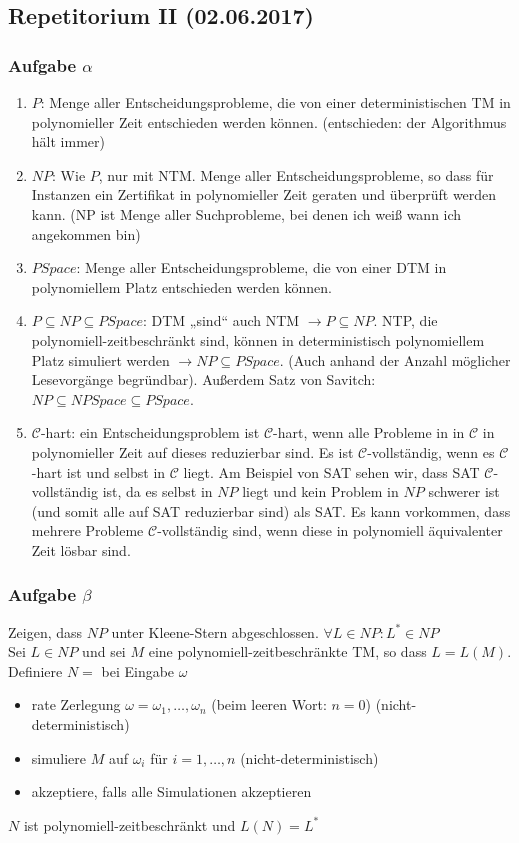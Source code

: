 \subsection{Repetitorium II (02.06.2017)}
\subsubsection*{Aufgabe $\alpha$}
    \begin{enumerate}
        \item $P$: Menge aller Entscheidungsprobleme, die von einer deterministischen TM in polynomieller Zeit entschieden werden können. (entschieden: der Algorithmus hält immer)
        \item $NP$: Wie $P$, nur mit NTM. Menge aller Entscheidungsprobleme, so dass für Instanzen ein Zertifikat in polynomieller Zeit geraten und überprüft werden kann. (NP ist Menge aller Suchprobleme, bei denen ich weiß wann ich angekommen bin)
        \item $PSpace$: Menge aller Entscheidungsprobleme, die von einer DTM in polynomiellem Platz entschieden werden können.
        \item $P \subseteq NP \subseteq PSpace$: DTM „sind“ auch NTM $\to P \subseteq NP$. NTP, die polynomiell-zeitbeschränkt sind, können in deterministisch polynomiellem Platz simuliert werden $\to NP \subseteq PSpace$. (Auch anhand der Anzahl möglicher Lesevorgänge begründbar). Außerdem Satz von Savitch: $NP \subseteq NPSpace \subseteq PSpace$.
        \item $\mathcal{C}$-hart: ein Entscheidungsproblem ist $\mathcal{C}$-hart, wenn alle Probleme in in $\mathcal{C}$ in polynomieller Zeit auf dieses reduzierbar sind. Es ist $\mathcal{C}$-vollständig, wenn es $\mathcal{C}$-hart ist und selbst in $\mathcal{C}$ liegt. Am Beispiel von SAT sehen wir, dass SAT $\mathcal{C}$-vollständig ist, da es selbst in $NP$ liegt und kein Problem in $NP$ schwerer ist (und somit alle auf SAT reduzierbar sind) als SAT. Es kann vorkommen, dass mehrere Probleme $\mathcal{C}$-vollständig sind, wenn diese in polynomiell äquivalenter Zeit lösbar sind.
    \end{enumerate}

\subsubsection*{Aufgabe $\beta$}
    Zeigen, dass $NP$ unter Kleene-Stern abgeschlossen. $\forall L \in \mathit{NP}: L^{*} \in \mathit{NP}$ \\
    Sei $L \in \mathit{NP}$ und sei $M$ eine polynomiell-zeitbeschränkte TM, so dass $L = L(M)$. \\
    Definiere $N = $ bei Eingabe $\omega$
    \begin{itemize}
        \item rate Zerlegung $\omega = \omega_{1},\dots,\omega_{n}$ (beim leeren Wort: $n=0$) (nicht-deterministisch)
        \item simuliere $M$ auf $\omega_{i}$ für $i = 1,\dots,n$ (nicht-deterministisch)
        \item akzeptiere, falls alle Simulationen akzeptieren
    \end{itemize}
    $N$ ist polynomiell-zeitbeschränkt und $L(N) = L^{*}$


